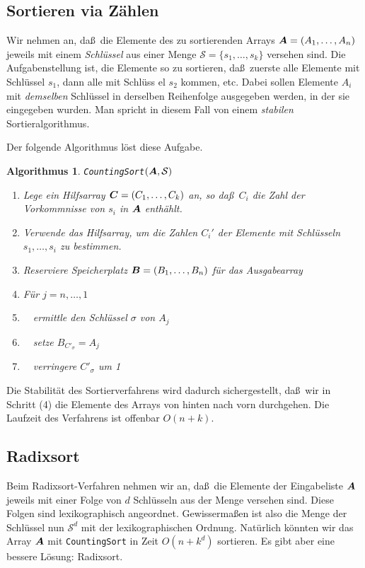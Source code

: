 \documentclass[10pt,reqno]{amsart}
\numberwithin{equation}{section}
\newcommand\cS{\mathcal S}
\newcommand\vA{\vec A}
\newcommand\vB{\vec B}
\newcommand\vC{\vec C}
\def\vec#1{\mathchoice{\mbox{\boldmath$\displaystyle#1$}}
{\mbox{\boldmath$\textstyle#1$}}
{\mbox{\boldmath$\scriptstyle#1$}}
{\mbox{\boldmath$\scriptscriptstyle#1$}}}
\newtheorem{algorithm}[definition]{Algorithmus}
\begin{document}
\subsection{Sortieren via Z\"ahlen}\label{sec_counting}
Wir nehmen an, da\ss\ die Elemente des zu sortierenden Arrays $\vA=(A_1,\ldots,A_n)$ jeweils mit einem \emph{Schl\"ussel} aus einer Menge $\cS=\{s_1,\ldots,s_k\}$ versehen sind.
Die Aufgabenstellung ist, die Elemente so zu sortieren, da\ss\ zuerste alle Elemente mit Schl\"ussel $s_1$, dann alle mit Schl\"uss el $s_2$ kommen, etc.
Dabei sollen Elemente $A_i$ mit {\em demselben} Schl\"ussel in derselben Reihenfolge ausgegeben werden, in der sie eingegeben wurden.
Man spricht in diesem Fall von einem \emph{stabilen} Sortieralgorithmus.

Der folgende Algorithmus l\"ost diese Aufgabe.

\begin{algorithm}{\tt CountingSort$(\vA,\cS)$}
	\begin{enumerate}
		\item Lege ein Hilfsarray $\vC=(C_1,\ldots,C_k)$ an, so da\ss\ $C_i$ die Zahl der Vorkommnisse von $s_i$ in $\vA$ enth\"ahlt.
		\item Verwende das Hilfsarray, um die Zahlen $C_i'$ der Elemente mit Schl\"usseln $s_1,\ldots,s_i$ zu bestimmen.
		\item Reserviere Speicherplatz $\vB=(B_1,\ldots,B_n)$ f\"ur das Ausgabearray
		\item F\"ur $j=n,\ldots,1$
		\item $\quad$ermittle den Schl\"ussel $\sigma$ von $A_j$
		\item $\quad$setze $B_{C'_\sigma}=A_j$
		\item $\quad$verringere $C'_\sigma$ um 1
	\end{enumerate}
\end{algorithm}

Die Stabilit\"at des Sortierverfahrens wird dadurch sichergestellt, da\ss\ wir in Schritt (4) die Elemente des Arrays von hinten nach vorn durchgehen.
Die Laufzeit des Verfahrens ist offenbar $O(n+k)$.

\subsection{Radixsort}\label{sec_radixsort}
Beim Radixsort-Verfahren nehmen wir an, da\ss\ die Elemente der Eingabeliste $\vA$ jeweils mit einer Folge von $d$ Schl\"usseln aus der Menge versehen sind.
Diese Folgen sind lexikographisch angeordnet.
Gewisserma\ss en ist also die Menge der Schl\"ussel nun $\cS^d$ mit der lexikographischen Ordnung.
Nat\"urlich k\"onnten wir das Array $\vA$ mit {\tt CountingSort} in Zeit $O(n+k^d)$ sortieren.
Es gibt aber eine bessere L\"osung: Radixsort.
\end{document}
